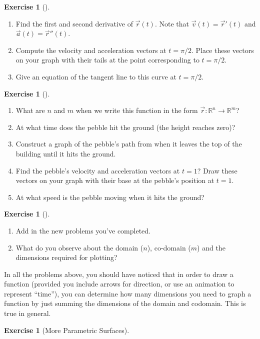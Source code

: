 \documentclass[10pt,]{book}
\theoremstyle{plain}
\theoremstyle{definition}
\theoremstyle{definition}
\theoremstyle{definition}
\theoremstyle{definition}
\newtheorem{exploration}[project]{Exercise}
\theoremstyle{definition}
\numberwithin{equation}{section}
\begin{document}
\begin{exploration}[]\label{exploration-107}
\leavevmode%
\begin{enumerate}[font=\bfseries,label=(\alph*),ref=\alph*]
\item\label{task-193} Find the first and second derivative of \(\vec r(t)\). Note that \(\vec{v}(t) = \vec{r}'(t)\) and \(\vec{a}(t)=\vec{r}''(t)\).%
\item\label{task-194} Compute the velocity and acceleration vectors at \(t=\pi/2\). Place these vectors on your graph with their tails at the point corresponding to \(t=\pi/2\).%
\item\label{task-195} Give an equation of the tangent line to this curve at \(t=\pi/2\).%
\end{enumerate}
\end{exploration}
\begin{exploration}[]\label{exploration-108}
\leavevmode%
\begin{enumerate}[font=\bfseries,label=(\alph*),ref=\alph*]
\item\label{task-196} What are \(n\) and \(m\) when we write this function in the form  \(\vec r\colon {\mathbb{R}}^n\to {\mathbb{R}}^m\)?%
\item\label{task-197} At what time does the pebble hit the ground (the height reaches zero)?%
\item\label{task-198} Construct a graph of the pebble's path from when it leaves the top of the building until it hits the ground.%
\item\label{task-199} Find the pebble's velocity and acceleration vectors at \(t=1\)? Draw these vectors on your graph with their base at the pebble's position at \(t=1\).%
\item\label{task-200} At what speed is the pebble moving when it hits the ground?%
\end{enumerate}
\end{exploration}
\begin{exploration}[]\label{exploration-109}
\leavevmode%
\begin{enumerate}[font=\bfseries,label=(\alph*),ref=\alph*]
\item\label{task-201} Add in the new problems you've completed.%
\item\label{task-202} What do you observe about the domain (\(n\)), co-domain (\(m\)) and the dimensions required for plotting?%
\end{enumerate}
\end{exploration}
In all the problems above, you should have noticed that in order to draw a function (provided you include arrows for direction, or use an animation to represent ``time''), you can determine how many dimensions you need to graph a function by just summing the dimensions of the domain and codomain. This is true in general.%
\begin{exploration}[More Parametric Surfaces]\label{second_parametric_surface_example}
\end{exploration}
\typeout{************************************************}
\typeout{************************************************}
\end{document}
